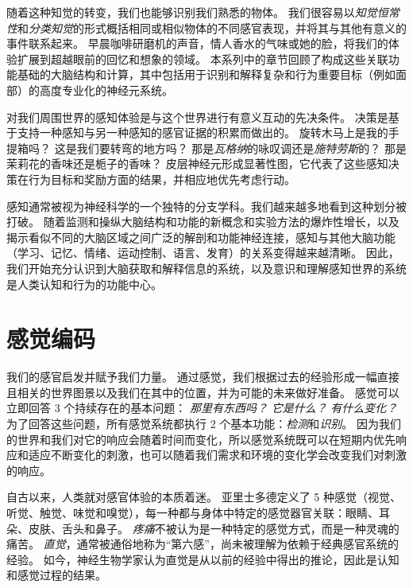 随着这种知觉的转变，我们也能够识别我们熟悉的物体。
我们很容易以\textit{知觉恒常性}和\textit{分类知觉}的形式概括相同或相似物体的不同感官表现，并将其与其他有意义的事件联系起来。
早晨咖啡研磨机的声音，情人香水的气味或她的脸，将我们的体验扩展到超越眼前的回忆和想象的领域。
本系列中的章节回顾了构成这些关联功能基础的大脑结构和计算，其中包括用于识别和解释复杂和行为重要目标（例如面部）的高度专业化的神经元系统。


对我们周围世界的感知体验是与这个世界进行有意义互动的先决条件。
决策是基于支持一种感知与另一种感知的感官证据的积累而做出的。
旋转木马上是我的手提箱吗？
这是我们要转弯的地方吗？
那是\textit{瓦格纳}的咏叹调还是\textit{施特劳斯}的？
那是茉莉花的香味还是栀子的香味？
皮层神经元形成显著性图，它代表了这些感知决策在行为目标和奖励方面的结果，并相应地优先考虑行动。


感知通常被视为神经科学的一个独特的分支学科。我们越来越多地看到这种划分被打破。
随着监测和操纵大脑结构和功能的新概念和实验方法的爆炸性增长，以及揭示看似不同的大脑区域之间广泛的解剖和功能神经连接，感知与其他大脑功能（学习、记忆、情绪、运动控制、语言、发育）的关系变得越来越清晰。
因此，我们开始充分认识到大脑获取和解释信息的系统，以及意识和理解感知世界的系统是人类认知和行为的功能中心。



\chapter{感觉编码} \label{chap:chap17}


我们的感官启发并赋予我们力量。
通过感觉，我们根据过去的经验形成一幅直接且相关的世界图景以及我们在其中的位置，并为可能的未来做好准备。 
感觉可以立即回答 3 个持续存在的基本问题：
\textit{那里有东西吗？}
\textit{它是什么？}
\textit{有什么变化？}
为了回答这些问题，所有感觉系统都执行 2 个基本功能：\textit{检测}和\textit{识别}。
因为我们的世界和我们对它的响应会随着时间而变化，所以感觉系统既可以在短期内优先响应和适应不断变化的刺激，也可以随着我们需求和环境的变化学会改变我们对刺激的响应。


自古以来，人类就对感官体验的本质着迷。
亚里士多德定义了 5 种感觉（视觉、听觉、触觉、味觉和嗅觉），每一种都与身体中特定的感觉器官关联：眼睛、耳朵、皮肤、舌头和鼻子。
\textit{疼痛}不被认为是一种特定的感觉方式，而是一种灵魂的痛苦。
\textit{直觉}，通常被通俗地称为“第六感”，尚未被理解为依赖于经典感官系统的经验。
如今，神经生物学家认为直觉是从以前的经验中得出的推论，因此是认知和感觉过程的结果。


